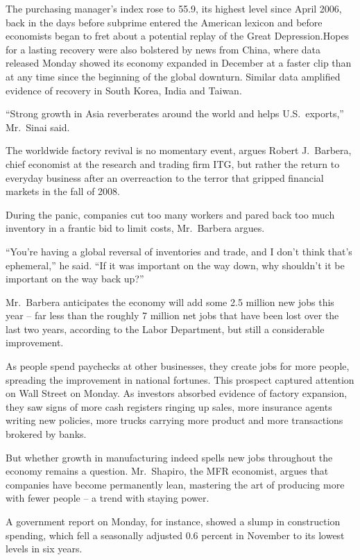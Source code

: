 ﻿\documentclass[12pt]{article}
\begin{document}
The purchasing manager's index rose to 55.9, its highest level since April 2006, back in the days
before subprime entered the American lexicon and before economists began to fret about a potential
replay of the Great Depression.Hopes for a lasting recovery were also bolstered by news from China,
where data released Monday showed its economy expanded in December at a faster clip than at any time
since the beginning of the global downturn. Similar data amplified evidence of recovery in South
Korea, India and Taiwan.

``Strong growth in Asia reverberates around the world and helps U.S.~exports,'' Mr.~Sinai said.

The worldwide factory revival is no momentary event, argues Robert J.~Barbera, chief economist at
the research and trading firm ITG, but rather the return to everyday business after an overreaction
to the terror that gripped financial markets in the fall of 2008.

During the panic, companies cut too many workers and pared back too much inventory in a frantic bid
to limit costs, Mr.~Barbera argues.

``You're having a global reversal of inventories and trade, and I don't think that's ephemeral,'' he
said. ``If it was important on the way down, why shouldn't it be important on the way back up?''

Mr.~Barbera anticipates the economy will add some 2.5 million new jobs this year -- far less than
the roughly 7 million net jobs that have been lost over the last two years, according to the Labor
Department, but still a considerable improvement.

As people spend paychecks at other businesses, they create jobs for more people, spreading the
improvement in national fortunes. This prospect captured attention on Wall Street on Monday. As
investors absorbed evidence of factory expansion, they saw signs of more cash registers ringing up
sales, more insurance agents writing new policies, more trucks carrying more product and more
transactions brokered by banks.

But whether growth in manufacturing indeed spells new jobs throughout the economy remains a
question. Mr.~Shapiro, the MFR economist, argues that companies have become permanently lean,
mastering the art of producing more with fewer people -- a trend with staying power.

A government report on Monday, for instance, showed a slump in construction spending, which fell a
seasonally adjusted 0.6 percent in November to its lowest levels in six years.
\end{document}
